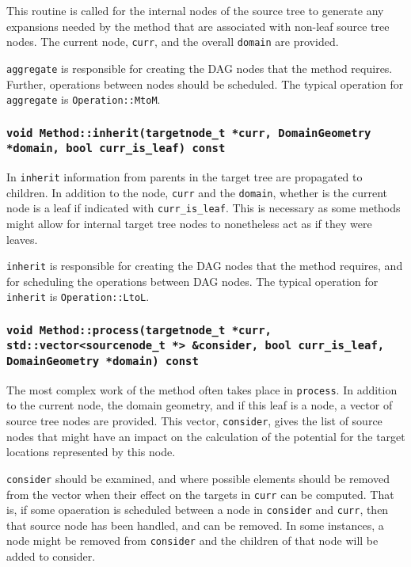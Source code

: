 This routine is called for the internal nodes of the source tree to generate
any expansions needed by the method that are associated with non-leaf source
tree nodes. The current node, \texttt{curr}, and the overall \texttt{domain}
are provided.

\texttt{aggregate} is responsible for creating the DAG nodes that the method
requires. Further, operations between nodes should be scheduled. The typical
operation for \texttt{aggregate} is \texttt{Operation::MtoM}.

\subsubsection{\texttt{void Method::inherit(targetnode\_t *curr, DomainGeometry *domain, bool curr\_is\_leaf) const}}

In \texttt{inherit} information from parents in the target tree are propagated
to children. In addition to the node, \texttt{curr} and the \texttt{domain},
whether is the current node is a leaf if indicated with
\texttt{curr\_is\_leaf}. This is necessary as some methods might allow for
internal target tree nodes to nonetheless act as if they were leaves.

\texttt{inherit} is responsible for creating the DAG nodes that the method
requires, and for scheduling the operations between DAG nodes. The typical
operation for \texttt{inherit} is \texttt{Operation::LtoL}.

\subsubsection{\texttt{void Method::process(targetnode\_t *curr, std::vector<sourcenode\_t *> \&consider, bool curr\_is\_leaf, DomainGeometry *domain) const}}

The most complex work of the method often takes place in \texttt{process}. In
addition to the current node, the domain geometry, and if this leaf is a node,
a vector of source tree nodes are provided. This vector, \texttt{consider},
gives the list of source nodes that might have an impact on the calculation of
the potential for the target locations represented by this node.

\texttt{consider} should be examined, and where possible elements should be
removed from the vector when their effect on the targets in \texttt{curr} can
be computed. That is, if some opaeration is scheduled between a node in
\texttt{consider} and \texttt{curr}, then that source node has been handled,
and can be removed. In some instances, a node might be removed from
\texttt{consider} and the children of that node will be added to consider.

